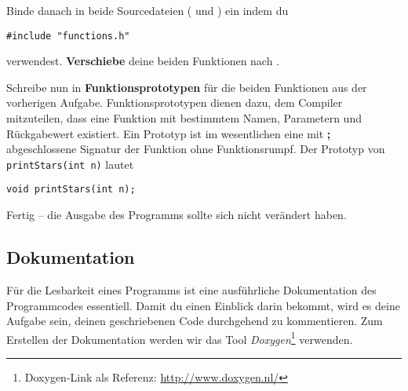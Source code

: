 Binde danach  in beide Sourcedateien ( und ) ein indem du

\begin{lstlisting}
#include "functions.h"
\end{lstlisting}

verwendest.
\textbf{Verschiebe} deine beiden Funktionen nach .

Schreibe nun in  \textbf{Funktionsprototypen} für die beiden Funktionen aus der vorherigen Aufgabe.
Funktionsprototypen dienen dazu, dem Compiler mitzuteilen, dass eine Funktion mit bestimmtem Namen, Parametern und Rückgabewert existiert.
Ein Prototyp ist im wesentlichen eine mit \textbf{;} abgeschlossene Signatur der Funktion ohne Funktionsrumpf.
Der Prototyp von \lstinline{printStars(int n)} lautet 
\begin{lstlisting}
void printStars(int n);
\end{lstlisting}

Fertig -- die Ausgabe des Programms sollte sich nicht verändert haben.


\subsection{Dokumentation} \label{basics:doc}
Für die Lesbarkeit eines Programms ist eine ausführliche Dokumentation des Programmcodes essentiell.
Damit du einen Einblick darin bekommt, wird es deine Aufgabe sein, deinen geschriebenen Code durchgehend zu kommentieren. 
Zum Erstellen der Dokumentation werden wir das Tool \emph{Doxygen}\footnote{Doxygen-Link als Referenz: \url{http://www.doxygen.nl/}} verwenden.

